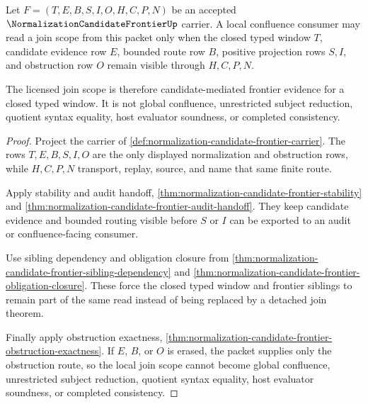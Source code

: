 \begin{theorem}
\label{thm:normalization-candidate-frontier-local-confluence-scope}
Let $F=(T,E,B,S,I,O,H,C,P,N)$ be an accepted $\NormalizationCandidateFrontierUp$ carrier. A local confluence consumer may read a join scope from this packet only when the closed typed window $T$, candidate evidence row $E$, bounded route row $B$, positive projection rows $S,I$, and obstruction row $O$ remain visible through $H,C,P,N$.

The licensed join scope is therefore candidate-mediated frontier evidence for a closed typed window. It is not global confluence, unrestricted subject reduction, quotient syntax equality, host evaluator soundness, or completed consistency.
\end{theorem}
\begin{proof}
Project the carrier of \autoref{def:normalization-candidate-frontier-carrier}. The rows $T,E,B,S,I,O$ are the only displayed normalization and obstruction rows, while $H,C,P,N$ transport, replay, source, and name that same finite route.

Apply stability and audit handoff, \autoref{thm:normalization-candidate-frontier-stability} and \autoref{thm:normalization-candidate-frontier-audit-handoff}. They keep candidate evidence and bounded routing visible before $S$ or $I$ can be exported to an audit or confluence-facing consumer.

Use sibling dependency and obligation closure from \autoref{thm:normalization-candidate-frontier-sibling-dependency} and \autoref{thm:normalization-candidate-frontier-obligation-closure}. These force the closed typed window and frontier siblings to remain part of the same read instead of being replaced by a detached join theorem.

Finally apply obstruction exactness, \autoref{thm:normalization-candidate-frontier-obstruction-exactness}. If $E$, $B$, or $O$ is erased, the packet supplies only the obstruction route, so the local join scope cannot become global confluence, unrestricted subject reduction, quotient syntax equality, host evaluator soundness, or completed consistency.
\end{proof}

